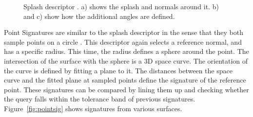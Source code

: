 \documentclass[11pt,a4paper]{kth-mag}
\begin{document}
\begin{figure}
  \centering
  \caption{Splash descriptor \cite{stein1992structural}. a) shows the splash and
    normals around it. b) and c) show how the additional angles are defined.
  }
  \label{fig:splash}
\end{figure}

Point Signatures are similar to the splash descriptor in the sense that they
both sample points on a circle \cite{chua1997point}. This descriptor again
selects a reference normal, and has a specific radius. This time, the radius
defines a sphere around the point. The intersection of the surface with the
sphere is a 3D space curve. The orientation of the curve is defined by fitting a
plane to it. The distances between the space curve and the fitted plane at
sampled points define the signature of the reference point. These signatures can
be compared by lining them up and checking whether the query falls within the
tolerance band of previous signatures. Figure~\ref{fig:pointsig} shows
signatures from various surfaces.
\end{document}
